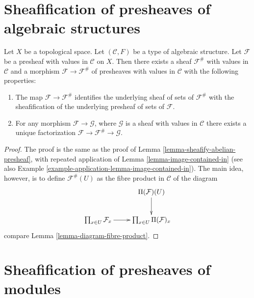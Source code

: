\section{Sheafification of presheaves of algebraic structures}
\label{section-sheafification-presheaves-structures}


\begin{lemma}
\label{lemma-sheafify-presheaf-structures}
Let $X$ be a topological space.
Let $(\mathcal{C}, F)$ be a type of algebraic structure.
Let $\mathcal{F}$ be a presheaf with values in $\mathcal{C}$
on $X$. Then there exists a sheaf $\mathcal{F}^\#$ with values
in $\mathcal{C}$ and a morphism $\mathcal{F} \to \mathcal{F}^\#$
of presheaves with values in $\mathcal{C}$ with the
following properties:
\begin{enumerate}
\item The map $\mathcal{F} \to \mathcal{F}^\#$ identifies
the underlying sheaf of sets of $\mathcal{F}^\#$ with
the sheafification of the underlying presheaf of sets of $\mathcal{F}$.
\item For any morphism $\mathcal{F} \to \mathcal{G}$, where
$\mathcal{G}$ is a sheaf with values in $\mathcal{C}$ there exists
a unique factorization $\mathcal{F} \to \mathcal{F}^\# \to \mathcal{G}$.
\end{enumerate}
\end{lemma}

\begin{proof}
The proof is the same as the proof of
Lemma \ref{lemma-sheafify-abelian-presheaf},
with repeated application of
Lemma \ref{lemma-image-contained-in} (see also
Example \ref{example-application-lemma-image-contained-in}).
The main idea, however, is to define $\mathcal{F}^\#(U)$
as the fibre product in $\mathcal{C}$ of the diagram
$$
\xymatrix{
 &
\Pi(\mathcal{F})(U) \ar[d] \\
\prod_{x \in U} \mathcal{F}_x
\ar[r] &
\prod_{x \in U} \Pi(\mathcal{F})_x
}
$$
compare Lemma \ref{lemma-diagram-fibre-product}.
\end{proof}

\section{Sheafification of presheaves of modules}
\label{section-sheafification-presheaves-modules}

